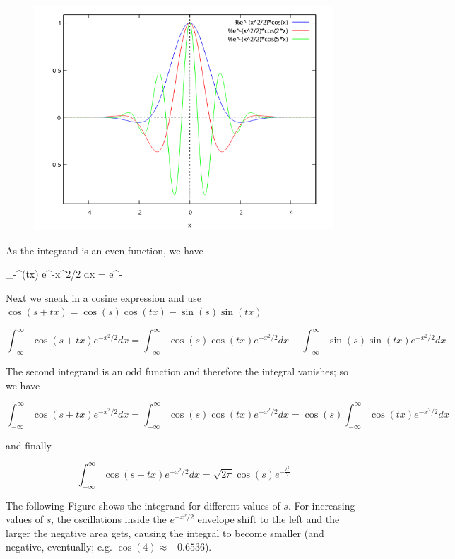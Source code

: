 \begin{figure}[H]
    \includegraphics[scale=0.7]{images/2022-03-21_plot_3.png}
\end{figure}

As the integrand is an even function, we have

\bee
\int_{-\infty}^\infty \cos(tx) e^{-x^2/2} dx = \sqrt{ 2\pi } e^{- }
\eee

Next we sneak in a cosine expression and use $\cos(s + tx) = \cos(s) \cos(tx) - \sin(s)\sin(tx)$

\begin{equation}
    \int_{-\infty}^\infty \cos(s + tx) e^{-x^2/2} dx = \int_{-\infty}^\infty \cos(s) \cos(tx) e^{-x^2/2} dx - \int_{-\infty}^\infty \sin(s) \sin(tx) e^{-x^2/2} dx
\end{equation}

The second integrand is an odd function and therefore the integral vanishes; so we have

\begin{equation}
    \int_{-\infty}^\infty \cos(s + tx) e^{-x^2/2} dx = \int_{-\infty}^\infty \cos(s) \cos(tx) e^{-x^2/2} dx = \cos(s) \int_{-\infty}^\infty \cos(tx) e^{-x^2/2} dx
\end{equation}

and finally

\begin{equation}
    \boxed{
    \int_{-\infty}^\infty \cos(s + tx) e^{-x^2/2} dx = \sqrt{ 2\pi } \cos(s) e^{- \frac{t^2}{2}}
    }
\end{equation}

The following Figure shows the integrand for different values of $s$. For increasing values of $s$, the oscillations inside the $e^{-x^2/2}$ envelope shift to the left and the larger the negative area gets, causing the integral to become smaller (and negative, eventually; e.g. $\cos(4) \approx -0.6536$).

